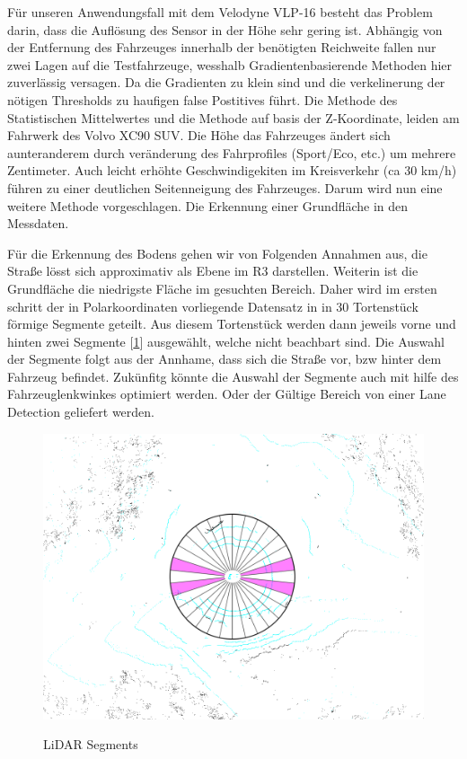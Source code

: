 \documentclass[11pt,oneside,openright]{mpreport}
\begin{document}
Für unseren Anwendungsfall mit dem Velodyne VLP-16 besteht das Problem darin, dass die Auflösung des Sensor in der Höhe sehr gering ist. Abhängig von der Entfernung des 
Fahrzeuges innerhalb der benötigten Reichweite fallen nur zwei Lagen auf die Testfahrzeuge, wesshalb Gradientenbasierende Methoden hier zuverlässig versagen.  Da die Gradienten zu klein sind und
die verkelinerung der nötigen Thresholds zu haufigen false Postitives führt. Die Methode des Statistischen Mittelwertes und die Methode auf basis der Z-Koordinate,
leiden am Fahrwerk des Volvo XC90 SUV. Die Höhe das Fahrzeuges ändert sich aunteranderem durch veränderung des Fahrprofiles (Sport/Eco, etc.) um mehrere Zentimeter.
Auch leicht erhöhte Geschwindigekiten im Kreisverkehr (ca 30 km/h) führen zu einer deutlichen Seitenneigung des Fahrzeuges. Darum wird nun eine weitere Methode vorgeschlagen.
Die Erkennung einer Grundfläche in den Messdaten. 

Für die Erkennung des Bodens gehen wir von Folgenden Annahmen aus, die Straße lösst sich approximativ als Ebene im R3 darstellen. Weiterin ist die Grundfläche die niedrigste
Fläche im gesuchten Bereich. Daher wird im ersten schritt der in Polarkoordinaten vorliegende Datensatz in  in 30 Tortenstück förmige Segmente geteilt.
Aus diesem Tortenstück werden dann jeweils vorne und hinten zwei Segmente [\cref{segments}] ausgewählt, welche nicht beachbart sind. Die Auswahl der Segmente folgt aus der Annhame,
dass sich die Straße vor, bzw hinter dem Fahrzeug befindet. Zukünfitg könnte die Auswahl der Segmente auch mit hilfe des Fahrzeuglenkwinkes optimiert werden. Oder der Gültige Bereich
von einer Lane Detection geliefert werden.

\begin{figure}[!ht]
\caption{LiDAR Segments}
\includegraphics[width=\textwidth]{bilder/segments.png}
\label{segments}
\end{figure}
\end{document}
